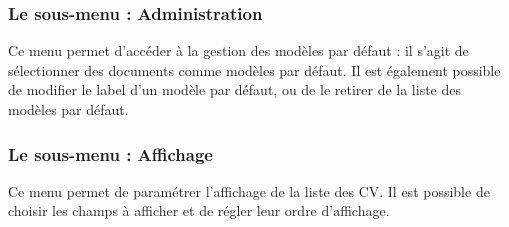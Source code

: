 \subsubsection{Le sous-menu : Administration}

Ce menu permet d'accéder à la gestion des modèles par défaut : il s'agit de sélectionner des documents \obm comme modèles par défaut. Il est également possible de modifier le label d'un modèle par défaut, ou de le retirer de la liste des modèles par défaut.

\subsubsection{Le sous-menu : Affichage}

Ce menu permet de paramétrer l'affichage de la liste des CV. Il est possible de choisir les champs à afficher et de régler leur ordre d'affichage.
